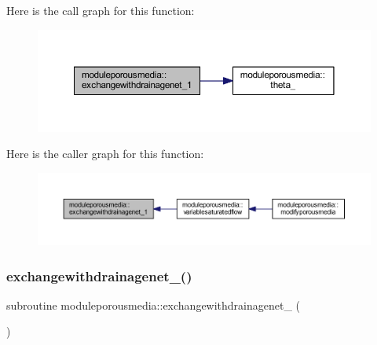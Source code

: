 Here is the call graph for this function\+:\nopagebreak
\begin{figure}[H]
\begin{center}
\leavevmode
\includegraphics[width=350pt]{namespacemoduleporousmedia_a448128120b85135d0a29b8fbdb5a0b1e_cgraph}
\end{center}
\end{figure}
Here is the caller graph for this function\+:\nopagebreak
\begin{figure}[H]
\begin{center}
\leavevmode
\includegraphics[width=350pt]{namespacemoduleporousmedia_a448128120b85135d0a29b8fbdb5a0b1e_icgraph}
\end{center}
\end{figure}
\mbox{\label{namespacemoduleporousmedia_a7459ca0efe1499228194caae424c0f28}} 
\subsubsection{\texorpdfstring{exchangewithdrainagenet\+\_()}{exchangewithdrainagenet\_2()}}
{\footnotesize\ttfamily subroutine moduleporousmedia\+::exchangewithdrainagenet\+\_ (\begin{DoxyParamCaption}{ }\end{DoxyParamCaption})\hspace{0.3cm}{\ttfamily [private]}}

